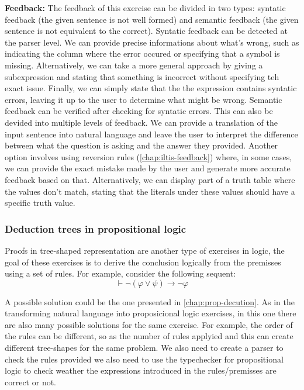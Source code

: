 \textbf{Feedback: } The feedback of this exercise can be divided in two types: syntatic feedback (the given sentence is not well formed) and semantic feedback (the given sentence is not equivalent to the correct). Syntatic feedback can be detected at the parser level. We can provide precise informations about what's wrong, such as indicating the column where the error occured or specifying that a symbol is missing. Alternatively, we can take a more general approach by giving a subexpression and stating that something is incorrect without specifying teh exact issue. Finally, we can simply state that the the expression contains syntatic errors, leaving it up to the user to determine what might be wrong. Semantic feedback can be verified after checking for syntatic errors. This can also be devided into multiple levels of feedback. We can provide a translation of the input sentence into natural language and leave the user to interpret the difference between what the question is asking and the answer they provided. Another option involves using reversion rules (\ref{chap:iltis-feedback}) where, in some cases, we can provide the exact mistake made by the user and generate more accurate feedback based on that. Alternatively, we can display part of a truth table where the values don't match, stating that the literals under these values should have a specific truth value.

\subsubsection{Deduction trees in propositional logic}
Proofs in tree-shaped representation are another type of exercises in logic, the goal of these exercises is to derive the conclusion logically from the premisses using a set of rules. For example, consider the following sequent:
\[
\vdash \neg (\varphi \lor \psi) \to \neg \varphi
\]

A possible solution could be the one presented in \ref{chap:prop-decution}. As in the transforming natural language into proposicional logic exercises, in this one there are also many possible solutions for the same exercise. For example, the order of the rules can be different, so as the number of rules applyied and this can create different tree-shapes for the same problem. We also need to create a parser to check the rules provided we also need to use the typechecker for propositional logic to check weather the expressions introduced in the rules/premisses are correct or not.

